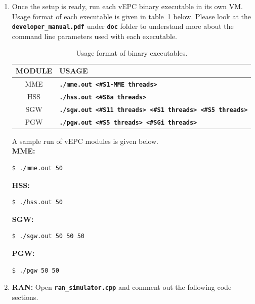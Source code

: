 \pdfminorversion=4\documentclass[hidelinks]{report}
\newcommand{\cf}[1] {
	\textbf{\texttt{#1}}
}
\begin{document}
\begin{enumerate}

\item Once the setup is ready, run each vEPC binary executable in its own VM. Usage format of each executable is given in table~\ref{bin_format} below. Please look at the \cf{developer\_manual.pdf} under \cf{doc} folder to understand more about the command line parameters used with each executable.

\begin{table}[H]

\caption{Usage format of binary executables.}
\centering
\label{bin_format}
\def\arraystretch{1.5}

\begin{tabular}{|c|p{11.5 cm}|}

\hline
\textbf{MODULE} & \textbf{USAGE} \\
\hline
MME & \cf{./mme.out <\#S1-MME threads>} \\
HSS & \cf{./hss.out <\#S6a threads>} \\
SGW & \cf{./sgw.out <\#S11 threads> <\#S1 threads> <\#S5 threads>} \\
PGW & \cf{./pgw.out <\#S5 threads> <\#SGi threads>} \\
\hline

\end{tabular}

\end{table}

A sample run of vEPC modules is given below.
~\\ \textbf{MME:}
\begin{lstlisting}[language=bash]
$ ./mme.out 50
\end{lstlisting}

\textbf{HSS:}
\begin{lstlisting}[language=bash]
$ ./hss.out 50
\end{lstlisting}

\textbf{SGW:}
\begin{lstlisting}[language=bash]
$ ./sgw.out 50 50 50
\end{lstlisting}

\textbf{PGW:}
\begin{lstlisting}[language=bash]
$ ./pgw 50 50
\end{lstlisting}

\item \textbf{RAN:} Open \cf{ran\_simulator.cpp} and comment out the following code sections.

\begin{itemize}


\end{itemize}
\end{enumerate}
\end{document}
